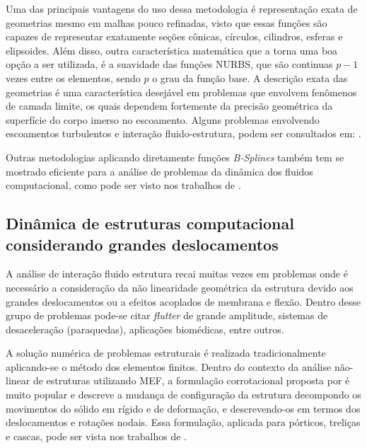 \documentclass[tese_patricia.tex]{subfiles}
\begin{document}
Uma das principais vantagens do uso dessa metodologia é representação exata de geometrias mesmo em malhas pouco refinadas, visto que essas funções são capazes de representar exatamente seções cônicas, círculos, cilindros, esferas e elipsoides. Além disso, outra característica matemática que a torna uma boa opção a ser utilizada, é a suavidade das funções NURBS, que são continuas $p-1$ vezes entre os elementos, sendo $p$ o grau da função base. A descrição exata das geometrias é uma característica desejável em problemas que envolvem fenômenos de camada limite, os quais dependem fortemente da precisão geométrica da superfície do corpo imerso no escoamento. Alguns problemas envolvendo escoamentos turbulentos e interação fluido-estrutura, podem ser consultados em: .

Outras metodologias aplicando diretamente funções \textit{B-Splines} também tem se mostrado eficiente para a análise de problemas da dinâmica dos fluidos computacional, como pode ser visto nos trabalhos de .


\subsection{Dinâmica de estruturas computacional considerando grandes deslocamentos}
\label{csdsection}

A análise de interação fluido estrutura recai muitas vezes em problemas onde é necessário a consideração da não linearidade geométrica da estrutura devido aos grandes deslocamentos ou a efeitos acoplados de membrana e flexão. Dentro desse grupo de problemas pode-se citar \textit{flutter} de grande amplitude, sistemas de desaceleração (paraquedas), aplicações biomédicas, entre outros.

A solução numérica de problemas estruturais é realizada tradicionalmente aplicando-se o método dos elementos finitos. Dentro do contexto da análise não-linear de estruturas utilizando MEF, a formulação corrotacional proposta por  é muito popular e descreve a mudança de configuração da estrutura decompondo os movimentos do sólido em rígido e de deformação, e descrevendo-os em termos dos deslocamentos e rotações nodais. Essa formulação, aplicada para pórticos, treliças e cascas, pode ser vista nos trabalhos de .
\end{document}
